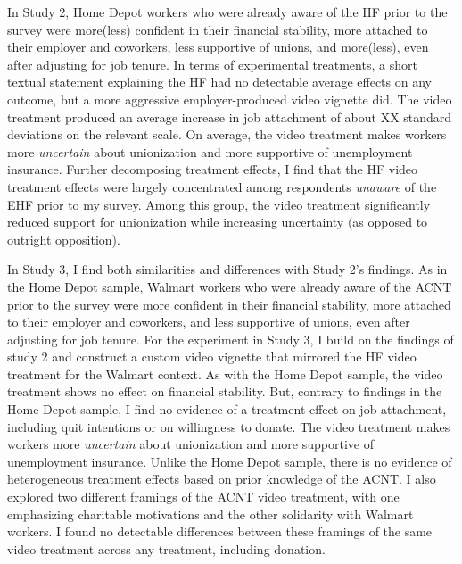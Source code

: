 \documentclass[
  11pt,
  oneside]{article}
\begin{document}
In Study 2, Home Depot workers who were already aware of the HF prior to the survey were more(less) confident in their financial stability, more attached to their employer and coworkers, less supportive of unions, and more(less), even after adjusting for job tenure. In terms of experimental treatments, a short textual statement explaining the HF had no detectable average effects on any outcome, but a more aggressive employer-produced video vignette did. The video treatment produced an average increase in job attachment of about XX standard deviations on the relevant scale. On average, the video treatment makes workers more \emph{uncertain} about unionization and more supportive of unemployment insurance. Further decomposing treatment effects, I find that the HF video treatment effects were largely concentrated among respondents \emph{unaware} of the EHF prior to my survey. Among this group, the video treatment significantly reduced support for unionization while increasing uncertainty (as opposed to outright opposition).

In Study 3, I find both similarities and differences with Study 2's findings. As in the Home Depot sample, Walmart workers who were already aware of the ACNT prior to the survey were more confident in their financial stability, more attached to their employer and coworkers, and less supportive of unions, even after adjusting for job tenure. For the experiment in Study 3, I build on the findings of study 2 and construct a custom video vignette that mirrored the HF video treatment for the Walmart context. As with the Home Depot sample, the video treatment shows no effect on financial stability. But, contrary to findings in the Home Depot sample, I find no evidence of a treatment effect on job attachment, including quit intentions or on willingness to donate. The video treatment makes workers more \emph{uncertain} about unionization and more supportive of unemployment insurance. Unlike the Home Depot sample, there is no evidence of heterogeneous treatment effects based on prior knowledge of the ACNT. I also explored two different framings of the ACNT video treatment, with one emphasizing charitable motivations and the other solidarity with Walmart workers. I found no detectable differences between these framings of the same video treatment across any treatment, including donation.
\end{document}
